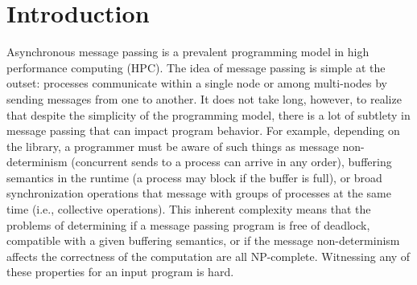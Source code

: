  \section{Introduction}
Asynchronous message passing is a prevalent programming model in high performance computing (HPC).
The idea of message passing is simple at the outset: processes communicate within a single node or among multi-nodes by sending messages from one to another. It does not take long, however, to realize that despite the simplicity of the programming model, there is a lot of subtlety in message passing that can impact program behavior. For example, depending on the library, a programmer must be aware of such things as message non-determinism (concurrent sends to a process can arrive in any order), buffering semantics in the runtime (a process may block if the buffer is full), or broad synchronization operations that message with  groups of processes at the same time (i.e., collective operations). This inherent complexity means that the problems of determining if a message passing program is free of deadlock, compatible with a given buffering semantics, or if the message non-determinism affects the correctness of the computation are all NP-complete. %
Witnessing any of these properties for an input program is hard.

